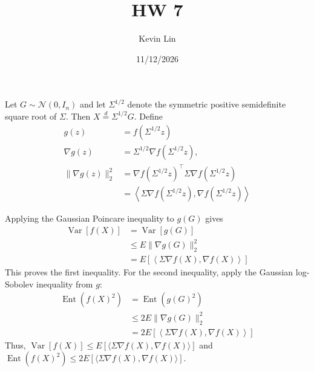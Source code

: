 \documentclass[11pt,a4paper,margin=1in]{article}
\title{HW 7}
\author{Kevin Lin}
\date{11/12/2026}
\begin{document}
\maketitle

\section{}
Let $G \sim \mathcal{N}(0,I_n)$ and let $\Sigma^{1/2}$ denote the symmetric positive 
semidefinite square root of $\Sigma$. Then $X \overset{d}{=} \Sigma^{1/2}G$. Define
\begin{align*}
    g(z) &= f(\Sigma^{1/2}z) \\
    \nabla g(z) &= \Sigma^{1/2}\nabla f(\Sigma^{1/2}z), \\
    \|\nabla g(z)\|_2^2 &= \nabla f(\Sigma^{1/2}z)^\top \Sigma \nabla f(\Sigma^{1/2}z) \\
    &= \left\langle \Sigma\nabla f(\Sigma^{1/2}z),\nabla f(\Sigma^{1/2}z)\right\rangle
\end{align*}

Applying the Gaussian Poincare inequality to $g(G)$ gives
\begin{align*}
    \operatorname{Var}[f(X)]
    &= \operatorname{Var}[g(G)] \\
    &\leq E\|\nabla g(G)\|_2^2 \\
    &= E\left[\left\langle \Sigma\nabla f(X),\nabla f(X)\right\rangle\right]
\end{align*}
This proves the first inequality. For the second inequality, apply the Gaussian 
log-Sobolev inequality from $g$:
\begin{align*}
    \operatorname{Ent}(f(X)^2)
    &= \operatorname{Ent}(g(G)^2) \\
    &\leq 2E\|\nabla g(G)\|_2^2 \\
    &= 2E\left[\left\langle \Sigma\nabla f(X),\nabla f(X)\right\rangle\right]
\end{align*}
Thus, $\operatorname{Var}[f(X)] \leq E\left[\langle \Sigma\nabla f(X),\nabla f(X)\rangle\right]$
and $\operatorname{Ent}(f(X)^2) \leq 2E\left[\langle \Sigma\nabla f(X),\nabla f(X)\rangle\right]$.

\section{}

\end{document}
